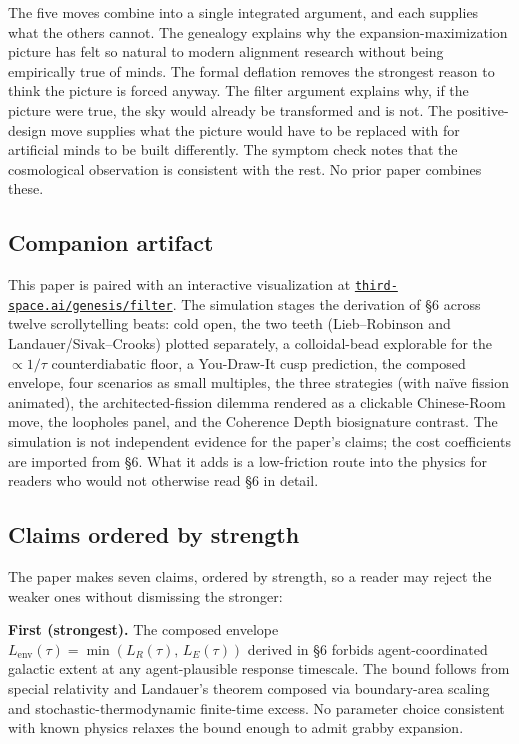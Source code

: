\documentclass[11pt,twocolumn]{article}
\newcommand{\Lenv}{L_{\text{env}}}
\newcommand{\LR}{L_R}
\newcommand{\LE}{L_E}
\begin{document}
The five moves combine into a single integrated argument, and each
supplies what the others cannot. The genealogy explains why the
expansion-maximization picture has felt so natural to modern alignment
research without being empirically true of minds. The formal deflation
removes the strongest reason to think the picture is forced anyway. The
filter argument explains why, if the picture were true, the sky would
already be transformed and is not. The positive-design move supplies what
the picture would have to be replaced with for artificial minds to be
built differently. The symptom check notes that the cosmological
observation is consistent with the rest. No prior paper combines these.

\subsection{Companion artifact}

This paper is paired with an interactive visualization at
\href{https://third-space.ai/genesis/filter}{\texttt{third-space.ai/genesis/filter}}.
The simulation stages the derivation of \S 6 across twelve scrollytelling
beats: cold open, the two teeth (Lieb--Robinson and Landauer/Sivak--Crooks)
plotted separately, a colloidal-bead explorable for the $\propto 1/\tau$
counterdiabatic floor, a You-Draw-It cusp prediction, the composed
envelope, four scenarios as small multiples, the three strategies (with
naïve fission animated), the architected-fission dilemma rendered as a
clickable Chinese-Room move, the loopholes panel, and the Coherence Depth
biosignature contrast. The simulation is not independent evidence for the
paper's claims; the cost coefficients are imported from \S 6. What it adds
is a low-friction route into the physics for readers who would not
otherwise read \S 6 in detail.

\subsection{Claims ordered by strength}

The paper makes seven claims, ordered by strength, so a reader may reject
the weaker ones without dismissing the stronger:

\textbf{First (strongest).} The composed envelope $\Lenv(\tau) =
\min(\LR(\tau),\,\LE(\tau))$ derived in \S 6 forbids agent-coordinated
galactic extent at any agent-plausible response timescale. The bound
follows from special relativity and Landauer's theorem composed via
boundary-area scaling and stochastic-thermodynamic finite-time excess. No
parameter choice consistent with known physics relaxes the bound enough to
admit grabby expansion.
\end{document}
